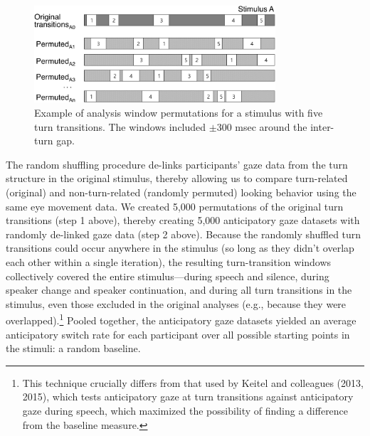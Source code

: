 \documentclass[authoryear, 12pt]{elsarticle}
\begin{document}
\begin{figure}[t!]
\begin{center}
\includegraphics[width=0.8\textwidth]{figures/FIG-ShuffledWindows.png}
\end{center}
\caption{Example of analysis window permutations for a stimulus with five turn transitions. The windows included $\pm$300 msec around the inter-turn gap.}
\label{fig:shuffling}
\end{figure}

The random shuffling procedure de-links participants' gaze data from the turn structure in the original stimulus, thereby allowing us to compare turn-related (original) and non-turn-related (randomly permuted) looking behavior using the same eye movement data. We created 5,000 permutations of the original turn transitions (step 1 above), thereby creating 5,000 anticipatory gaze datasets with randomly de-linked gaze data (step 2 above). Because the randomly shuffled turn transitions could occur anywhere in the stimulus (so long as they didn't overlap each other within a single iteration), the resulting turn-transition windows collectively covered the entire stimulus---during speech and silence, during speaker change and speaker continuation, and during all turn transitions in the stimulus, even those excluded in the original analyses (e.g., because they were overlapped).\footnote{This technique crucially differs from that used by Keitel and colleagues (2013, 2015), which tests anticipatory gaze at turn transitions against anticipatory gaze during speech, which maximized the possibility of finding a difference from the baseline measure.} Pooled together, the anticipatory gaze datasets yielded an average anticipatory switch rate for each participant over all possible starting points in the stimuli: a random baseline.
\end{document}
